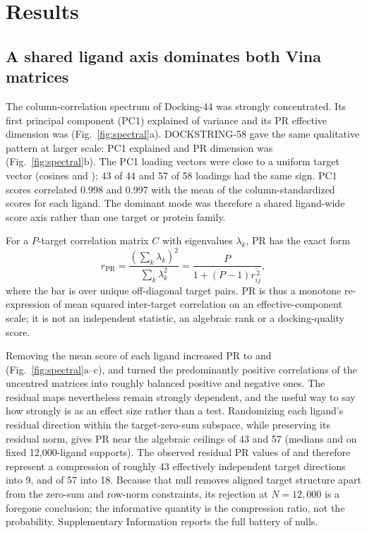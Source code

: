 \documentclass[11pt]{article}
\begin{document}
\section{Results}

\subsection{A shared ligand axis dominates both Vina matrices}

The column-correlation spectrum of Docking-44 was strongly concentrated. Its first
principal component (PC1) explained \DffPCOne{} of variance and its PR effective dimension
was \DffRawPR{} (Fig.~\ref{fig:spectral}a). DOCKSTRING-58 gave the same qualitative
pattern at larger scale: PC1 explained \DsPCOne{} and PR dimension was \DsRawPR{}
(Fig.~\ref{fig:spectral}b). The PC1 loading vectors were close to a uniform target vector
(cosines \DffUniformCosine{} and \DsUniformCosine{}); 43 of 44 and 57 of 58 loadings had
the same sign. PC1 scores correlated 0.998 and 0.997 with the mean of the
column-standardized scores for each ligand. The dominant mode was therefore a shared
ligand-wide score axis rather than one target or protein family.

For a $P$-target correlation matrix $C$ with eigenvalues $\lambda_k$, PR has the exact form
\begin{equation}
r_{\mathrm{PR}}
=\frac{(\sum_k\lambda_k)^2}{\sum_k\lambda_k^2}
=\frac{P}{1+(P-1)\overline{r_{ij}^{\,2}}},
\label{eq:pr}
\end{equation}
where the bar is over unique off-diagonal target pairs. PR is thus a monotone
re-expression of mean squared inter-target correlation on an effective-component scale; it
is not an independent statistic, an algebraic rank or a docking-quality score.

Removing the mean score of each ligand increased PR to \DffResidualPR{} and
\DsResidualPR{} (Fig.~\ref{fig:spectral}a--c), and turned the predominantly positive
correlations of the uncentred matrices into roughly balanced positive and negative ones. The
residual maps nevertheless remain strongly dependent, and the useful way to say how strongly
is as an effect size rather than a test. Randomizing each ligand's residual direction within
the target-zero-sum subspace, while preserving its residual norm, gives PR near the
algebraic ceilings of 43 and 57 (medians \DffRowNull{} and \DsRowNull{} on fixed
12,000-ligand supports). The observed residual PR values of
\DffCommonNullObservedPR{} and \DsCommonNullObservedPR{} therefore
represent a compression of roughly 43 effectively independent target directions into 9, and
of 57 into 18. Because that null removes aligned target structure apart from the zero-sum
and row-norm constraints, its rejection at
$N=12{,}000$ is a foregone conclusion; the informative quantity is the compression ratio, not
the probability. Supplementary Information reports the full battery of nulls.
\end{document}
